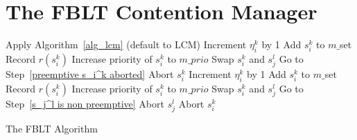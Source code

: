 \documentclass[prodmode,acmtecs]{acmsmall}
\begin{document}
\section{The FBLT Contention Manager}
\label{sec:fblt design}

\begin{algorithm}[h]
\footnotesize{
\LinesNumbered
{}
{
Apply Algorithm~\ref{alg_lcm} (default to LCM)\label{apply lcm}\;
{
{
Increment $\eta_i^k$ by 1\label{increment eta 1}\;
}
{
Add $s_i^k$ to $m\_$set\label{add to m_set 1}\;
Record $r(s_i^k)$\label{record 1}\;
Increase priority of $s_i^k$ to $m\_prio$\label{increase priority 1}\;
}
}
{
Swap $s_i^k$ and $s_j^l$\;
Go to Step~\ref{preemptive s_i^k aborted}\;
}
}
{
Abort $s_i^k$\;
{
Increment $\eta_i^k$ by 1\label{increment eta 2}\;
}
{
Add $s_i^k$ to $m\_$set\label{add to m_set 2}\;
Record $r(s_i^k)$\label{record 2}\;
Increase priority of $s_i^k$ to $m\_prio$\label{increase priority 2}\;
}
}
{
Swap $s_i^k$ and $s_j^l$\;
Go to Step~\ref{s_j^l is non preemptive}\label{end preemptive and non preemptive}\;
}
\Else
{
\label{both non preemptive}
{	
Abort $s_j^l$\label{s_i^k first in m_set}\;
}
{
Abort $s_i^k$\label{s_j^l first in m_set}\;
}
}
}
\caption{The FBLT Algorithm}\label{fblt-algorithm}
\end{algorithm}
\end{document}
